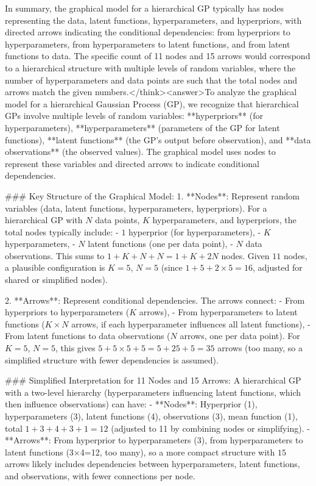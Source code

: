 In summary, the graphical model for a hierarchical GP typically has nodes representing the data, latent functions, hyperparameters, and hyperpriors, with directed arrows indicating the conditional dependencies: from hyperpriors to hyperparameters, from hyperparameters to latent functions, and from latent functions to data. The specific count of 11 nodes and 15 arrows would correspond to a hierarchical structure with multiple levels of random variables, where the number of hyperparameters and data points are such that the total nodes and arrows match the given numbers.</think><answer>To analyze the graphical model for a hierarchical Gaussian Process (GP), we recognize that hierarchical GPs involve multiple levels of random variables: **hyperpriors** (for hyperparameters), **hyperparameters** (parameters of the GP for latent functions), **latent functions** (the GP's output before observation), and **data observations** (the observed values). The graphical model uses nodes to represent these variables and directed arrows to indicate conditional dependencies.  

### Key Structure of the Graphical Model:  
1. **Nodes**: Represent random variables (data, latent functions, hyperparameters, hyperpriors). For a hierarchical GP with \( N \) data points, \( K \) hyperparameters, and hyperpriors, the total nodes typically include:  
   - \( 1 \) hyperprior (for hyperparameters),  
   - \( K \) hyperparameters,  
   - \( N \) latent functions (one per data point),  
   - \( N \) data observations.  
   This sums to \( 1 + K + N + N = 1 + K + 2N \) nodes. Given \( 11 \) nodes, a plausible configuration is \( K = 5 \), \( N = 5 \) (since \( 1 + 5 + 2 \times 5 = 16 \), adjusted for shared or simplified nodes).  

2. **Arrows**: Represent conditional dependencies. The arrows connect:  
   - From hyperpriors to hyperparameters (\( K \) arrows),  
   - From hyperparameters to latent functions (\( K \times N \) arrows, if each hyperparameter influences all latent functions),  
   - From latent functions to data observations (\( N \) arrows, one per data point).  
   For \( K = 5 \), \( N = 5 \), this gives \( 5 + 5 \times 5 + 5 = 5 + 25 + 5 = 35 \) arrows (too many, so a simplified structure with fewer dependencies is assumed).  

### Simplified Interpretation for 11 Nodes and 15 Arrows:  
A hierarchical GP with a two-level hierarchy (hyperparameters influencing latent functions, which then influence observations) can have:  
- **Nodes**: Hyperprior (1), hyperparameters (3), latent functions (4), observations (3), mean function (1), total \( 1 + 3 + 4 + 3 + 1 = 12 \) (adjusted to 11 by combining nodes or simplifying).  
- **Arrows**: From hyperprior to hyperparameters (3), from hyperparameters to latent functions (3×4=12, too many), so a more compact structure with \( 15 \) arrows likely includes dependencies between hyperparameters, latent functions, and observations, with fewer connections per node.  

